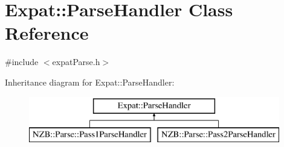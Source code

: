 \hypertarget{class_expat_1_1_parse_handler}{}\section{Expat\+:\+:Parse\+Handler Class Reference}
\label{class_expat_1_1_parse_handler}


{\ttfamily \#include $<$expat\+Parse.\+h$>$}

Inheritance diagram for Expat\+:\+:Parse\+Handler\+:\begin{figure}[H]
\begin{center}
\leavevmode
\includegraphics[height=2.000000cm]{class_expat_1_1_parse_handler}
\end{center}
\end{figure}
